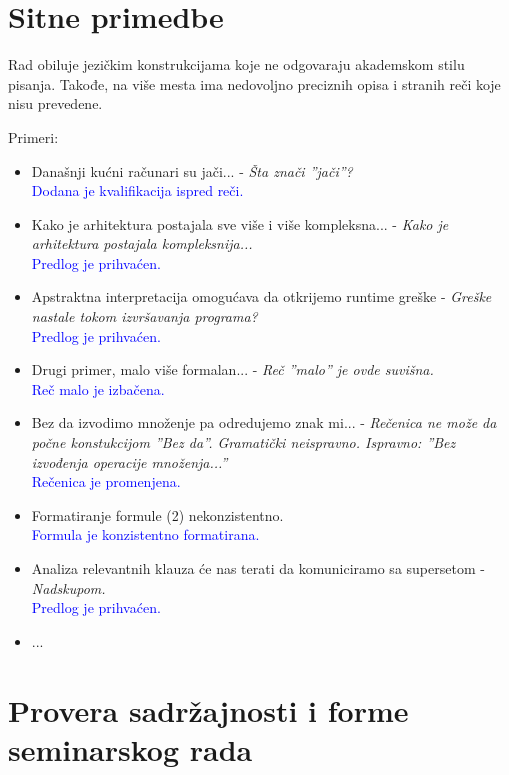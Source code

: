 \documentclass[a4paper]{report}
\newcommand{\odgovor}[1]{\textcolor{blue}{#1}}
\begin{document}
\section{Sitne primedbe}
Rad obiluje jezičkim konstrukcijama koje ne odgovaraju akademskom stilu pisanja. Takođe, na više mesta ima nedovoljno preciznih opisa i stranih reči koje nisu prevedene. 
\par
Primeri:
\begin{itemize}
\item Današnji kućni računari su jači... - \emph{Šta znači ''jači''?}
\\
\odgovor{Dodana je kvalifikacija ispred reči.}

\item Kako je arhitektura postajala sve više i više kompleksna... - \emph{Kako je arhitektura postajala kompleksnija...}
\\
\odgovor{Predlog je prihvaćen.}

\item Apstraktna interpretacija omogućava da otkrijemo runtime greške - \emph{Greške nastale tokom izvršavanja programa?}
\\
\odgovor{Predlog je prihvaćen.}

\item Drugi primer, malo više formalan... - \emph{Reč ''malo'' je ovde suvišna. }
\\
\odgovor{Reč malo je izbačena.}

\item Bez da izvodimo množenje pa odredujemo znak mi... - \emph {Rečenica ne može da počne konstukcijom ''Bez da''. Gramatički neispravno. Ispravno: ''Bez izvođenja operacije množenja...''}
\\
\odgovor{Rečenica je promenjena.}

\item Formatiranje formule (2) nekonzistentno.
\\
\odgovor{Formula je konzistentno formatirana.}

\item Analiza relevantnih klauza će nas terati da komuniciramo sa supersetom - \emph{Nadskupom. }
\\
\odgovor{Predlog je prihvaćen.}

\item ...
\end{itemize}  

\section{Provera sadržajnosti i forme seminarskog rada}
\end{document}
